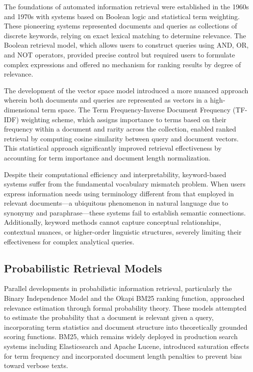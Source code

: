 The foundations of automated information retrieval were established in the 1960s and 1970s with systems based on Boolean logic and statistical term weighting. These pioneering systems represented documents and queries as collections of discrete keywords, relying on exact lexical matching to determine relevance. The Boolean retrieval model, which allows users to construct queries using AND, OR, and NOT operators, provided precise control but required users to formulate complex expressions and offered no mechanism for ranking results by degree of relevance.

The development of the vector space model introduced a more nuanced approach wherein both documents and queries are represented as vectors in a high-dimensional term space. The Term Frequency-Inverse Document Frequency (TF-IDF) weighting scheme, which assigns importance to terms based on their frequency within a document and rarity across the collection, enabled ranked retrieval by computing cosine similarity between query and document vectors. This statistical approach significantly improved retrieval effectiveness by accounting for term importance and document length normalization.

Despite their computational efficiency and interpretability, keyword-based systems suffer from the fundamental vocabulary mismatch problem. When users express information needs using terminology different from that employed in relevant documents---a ubiquitous phenomenon in natural language due to synonymy and paraphrase---these systems fail to establish semantic connections. Additionally, keyword methods cannot capture conceptual relationships, contextual nuances, or higher-order linguistic structures, severely limiting their effectiveness for complex analytical queries.

\subsection{Probabilistic Retrieval Models}

Parallel developments in probabilistic information retrieval, particularly the Binary Independence Model and the Okapi BM25 ranking function, approached relevance estimation through formal probability theory. These models attempted to estimate the probability that a document is relevant given a query, incorporating term statistics and document structure into theoretically grounded scoring functions. BM25, which remains widely deployed in production search systems including Elasticsearch and Apache Lucene, introduced saturation effects for term frequency and incorporated document length penalties to prevent bias toward verbose texts.

